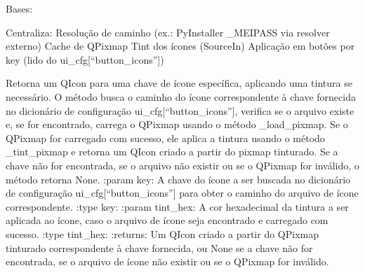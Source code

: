 \documentclass[letterpaper,10pt,english]{sphinxmanual}
\begin{document}
\begin{fulllineitems}
\label{\detokenize{api/icon_manager:icon_manager.IconManager}}
\pysigstartsignatures
\pysiglinewithargsret
{}
{\sphinxparamcomma {}\sphinxparamcomma {}}
{}
\pysigstopsignatures
\sphinxAtStartPar
Bases: 

\sphinxAtStartPar
Centraliza:
\sphinxhyphen{} Resolução de caminho (ex.: PyInstaller \_MEIPASS via resolver externo)
\sphinxhyphen{} Cache de QPixmap
\sphinxhyphen{} Tint dos ícones (SourceIn)
\sphinxhyphen{} Aplicação em botões por key (lido do ui\_cfg{[}“button\_icons”{]})

\begin{fulllineitems}
\label{\detokenize{api/icon_manager:icon_manager.IconManager.icon_for_key}}
\pysigstartsignatures
\pysiglinewithargsret
{}
{\sphinxparamcomma {}}
{}
\pysigstopsignatures
\sphinxAtStartPar
Retorna um QIcon para uma chave de ícone específica, aplicando uma tintura se necessário. O método busca o caminho do ícone correspondente à chave fornecida no dicionário de configuração ui\_cfg{[}“button\_icons”{]}, verifica se o arquivo existe e, se for encontrado, carrega o QPixmap usando o método \_load\_pixmap. Se o QPixmap for carregado com sucesso, ele aplica a tintura usando o método \_tint\_pixmap e retorna um QIcon criado a partir do pixmap tinturado. Se a chave não for encontrada, se o arquivo não existir ou se o QPixmap for inválido, o método retorna None.
:param key: A chave do ícone a ser buscada no dicionário de configuração ui\_cfg{[}“button\_icons”{]} para obter o caminho do arquivo de ícone correspondente.
:type key: 
:param tint\_hex: A cor hexadecimal da tintura a ser aplicada ao ícone, caso o arquivo de ícone seja encontrado e carregado com sucesso.
:type tint\_hex: 
:returns: Um QIcon criado a partir do QPixmap tinturado correspondente à chave fornecida, ou None se a chave não for encontrada, se o arquivo de ícone não existir ou se o QPixmap for inválido.
\begin{quote}\begin{description}
\sphinxAtStartPar
{}


\end{description}
\end{quote}
\end{fulllineitems}
\end{fulllineitems}
\end{document}
